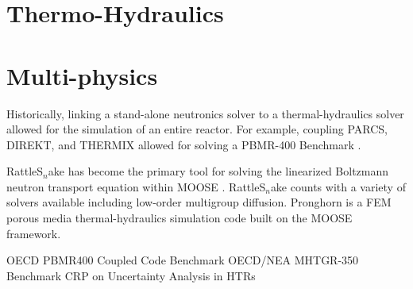 \documentclass[11pt,letterpaper]{article}
\begin{document}
\section{Thermo-Hydraulics}











\section{Multi-physics}

Historically, linking a stand-alone neutronics solver to a thermal-hydraulics solver allowed for the simulation of an entire reactor.
For example, coupling PARCS, DIREKT, and THERMIX \cite{seker_analysis_2006} allowed for solving a \gls{PBMR}-400 Benchmark \cite{reitsma_oecdneansc_2006}.

RattleS$_n$ake \cite{wang_nonlinear_2013} has become the primary tool for solving the linearized Boltzmann neutron transport equation within \gls{MOOSE} \cite{strydom_inl_2013}.
RattleS$_n$ake counts with a variety of solvers available including low-order multigroup diffusion.
Pronghorn \cite{bingham_pronghorn_2012} \cite{novak_pronghorn_2018} is a \gls{FEM} porous media thermal-hydraulics simulation code built on the \gls{MOOSE} framework.

OECD PBMR400 Coupled Code Benchmark %
OECD/NEA MHTGR-350 Benchmark %
CRP on Uncertainty Analysis in HTRs %
\cite{gougar_htgr_2016}


\pagebreak


\end{document}
